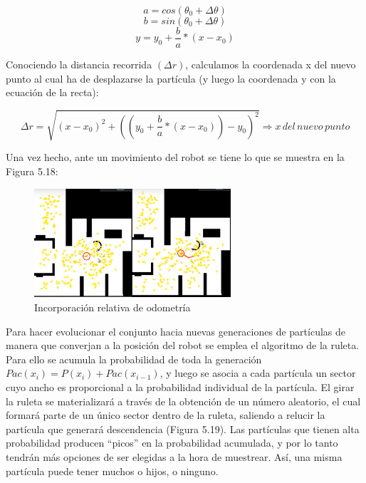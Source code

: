 \begin{equation}
a = cos(\theta_{0} + \Delta\theta)
\end{equation}
\begin{equation}
b = sin(\theta_{0} + \Delta\theta)
\end{equation}
\begin{equation}
y = y_{0} + \dfrac{b}{a} * (x-x_{0})
\end{equation}

Conociendo la distancia recorrida $(\Delta r)$, calculamos la coordenada x del nuevo punto al cual ha de desplazarse la partícula (y luego la coordenada y con la ecuación de la recta):

\begin{equation}
\Delta r = \sqrt{(x-x_{0})^2 + ((y_{0} + \dfrac{b}{a} * (x-x_{0}))-y_{0})^2} \Rightarrow x\, del\, nuevo\, punto
\end{equation}

Una vez hecho, ante un movimiento del robot se tiene lo que se muestra en la Figura 5.18:

\begin{figure}[H]
\begin{center}
	\includegraphics[width=0.65\textwidth]{figures/movimientoincorporado.png}
	\caption{Incorporación relativa de odometría}
	\label{fig.movimientoincorporado}
	\end{center}
\end{figure}

Para hacer evolucionar el conjunto hacia nuevas generaciones de partículas de manera que converjan a la posición del robot se emplea el algoritmo de la ruleta. Para ello se acumula la probabilidad de toda la generación $Pac(x_{i}) = P(x_{i})+Pac(x_{i-1})$, y luego se asocia a cada partícula un sector cuyo ancho es proporcional a la probabilidad individual de la partícula. El girar la ruleta se materializará a través de la obtención de un número aleatorio, el cual formará parte de un único sector dentro de la ruleta, saliendo a relucir la partícula que generará descendencia (Figura 5.19). Las partículas que tienen alta probabilidad producen “picos” en la probabilidad acumulada, y por lo tanto tendrán más opciones de ser elegidas a la hora de muestrear. Así, una misma partícula puede tener muchos o hijos, o ninguno.

